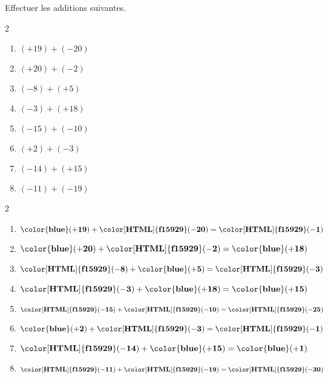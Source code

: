 \begin{exercice*}
    Effectuer les additions suivantes.
    \begin{multicols}2
        \begin{enumerate}            
                \item $ (+19) + (-20)$
                \item $ (+20) + (-2)$
                \item $ (-8) + (+5)$
                \item $ (-3) + (+18)$
                \item $ (-15) + (-10)$
                \item $ (+2) + (-3)$
                \item $ (-14) + (+15)$
                \item $ (-11) + (-19)$            
        \end{enumerate}
    \end{multicols}

\end{exercice*}
\begin{corrige}
    \phantom{rrr}
    \begin{multicols}2
        \begin{enumerate}
            \item $ \mathbf{{\color{blue}(+19)}} + \mathbf{{\color[HTML]{f15929}(-20)}} = \mathbf{{\color[HTML]{f15929}(-1)}} $
            \item $ \mathbf{{\color{blue}(+20)}} + \mathbf{{\color[HTML]{f15929}(-2)}} = \mathbf{{\color{blue}(+18)}} $
            \item $ \mathbf{{\color[HTML]{f15929}(-8)}} + \mathbf{{\color{blue}(+5)}} = \mathbf{{\color[HTML]{f15929}(-3)}} $
            \item $ \mathbf{{\color[HTML]{f15929}(-3)}} + \mathbf{{\color{blue}(+18)}} = \mathbf{{\color{blue}(+15)}} $
            \item $ \mathbf{{\color[HTML]{f15929}(-15)}} + \mathbf{{\color[HTML]{f15929}(-10)}} = \mathbf{{\color[HTML]{f15929}(-25)}} $
            \item $ \mathbf{{\color{blue}(+2)}} + \mathbf{{\color[HTML]{f15929}(-3)}} = \mathbf{{\color[HTML]{f15929}(-1)}} $
            \item $ \mathbf{{\color[HTML]{f15929}(-14)}} + \mathbf{{\color{blue}(+15)}} = \mathbf{{\color{blue}(+1)}} $
            \item $ \mathbf{{\color[HTML]{f15929}(-11)}} + \mathbf{{\color[HTML]{f15929}(-19)}} = \mathbf{{\color[HTML]{f15929}(-30)}} $
        \end{enumerate}   
    \end{multicols}
\end{corrige}